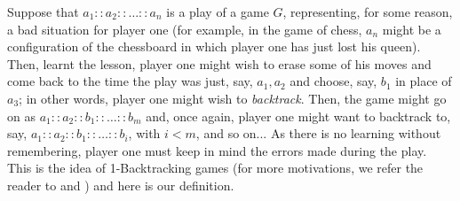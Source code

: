 \documentclass[copyright,creativecommons]{eptcs}
\begin{document}
 Suppose that $a_1::a_2::\ldots :: a_n$ is a play of a game $G$,
representing, for some reason, a bad situation for player one (for
example, in the game of chess, $a_n$ might be a configuration of
the
chessboard in which player one has just lost his queen). Then,
learnt the lesson, player one might wish to erase some of his moves
and come back to the time the play was just, say, $a_1,a_2$ and
choose, say, $b_1$ in place of $a_3$; in other words, player one
might wish to \emph{backtrack}. Then, the game might go on as
$a_1 :: a_2 ::b_1::\ldots :: b_m$ and, once again, player one might want to
backtrack to, say, $a_1::a_2::b_1::\ldots :: b_i$, with $i< m$, and so
on... As there is no learning without remembering, player one
must keep in mind  the errors made during the play. This is the
idea
of 1-Backtracking games  (for more motivations, we refer the reader to \cite{BerCoq} and \cite{BerLig}) and here is our definition. 
\end{document}

